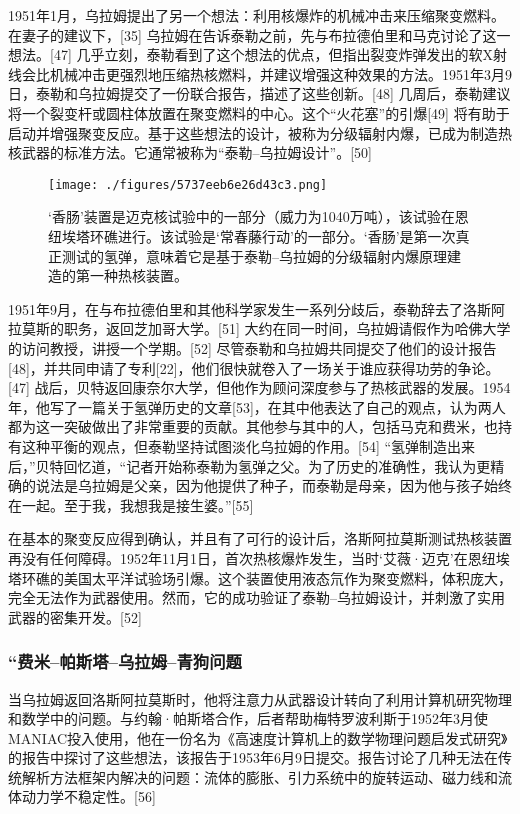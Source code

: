 1951年1月，乌拉姆提出了另一个想法：利用核爆炸的机械冲击来压缩聚变燃料。在妻子的建议下，[35] 乌拉姆在告诉泰勒之前，先与布拉德伯里和马克讨论了这一想法。[47] 几乎立刻，泰勒看到了这个想法的优点，但指出裂变炸弹发出的软X射线会比机械冲击更强烈地压缩热核燃料，并建议增强这种效果的方法。1951年3月9日，泰勒和乌拉姆提交了一份联合报告，描述了这些创新。[48] 几周后，泰勒建议将一个裂变杆或圆柱体放置在聚变燃料的中心。这个“火花塞”的引爆[49] 将有助于启动并增强聚变反应。基于这些想法的设计，被称为分级辐射内爆，已成为制造热核武器的标准方法。它通常被称为“泰勒–乌拉姆设计”。[50]
\begin{figure}[ht]
\centering
\texttt{[image: ./figures/5737eeb6e26d43c3.png]}
\caption{‘香肠’装置是迈克核试验中的一部分（威力为1040万吨），该试验在恩纽埃塔环礁进行。该试验是‘常春藤行动’的一部分。‘香肠’是第一次真正测试的氢弹，意味着它是基于泰勒–乌拉姆的分级辐射内爆原理建造的第一种热核装置。} \label{fig_Ulam_6}
\end{figure}
1951年9月，在与布拉德伯里和其他科学家发生一系列分歧后，泰勒辞去了洛斯阿拉莫斯的职务，返回芝加哥大学。[51] 大约在同一时间，乌拉姆请假作为哈佛大学的访问教授，讲授一个学期。[52] 尽管泰勒和乌拉姆共同提交了他们的设计报告[48]，并共同申请了专利[22]，他们很快就卷入了一场关于谁应获得功劳的争论。[47] 战后，贝特返回康奈尔大学，但他作为顾问深度参与了热核武器的发展。1954年，他写了一篇关于氢弹历史的文章[53]，在其中他表达了自己的观点，认为两人都为这一突破做出了非常重要的贡献。其他参与其中的人，包括马克和费米，也持有这种平衡的观点，但泰勒坚持试图淡化乌拉姆的作用。[54] “氢弹制造出来后，”贝特回忆道，“记者开始称泰勒为氢弹之父。为了历史的准确性，我认为更精确的说法是乌拉姆是父亲，因为他提供了种子，而泰勒是母亲，因为他与孩子始终在一起。至于我，我想我是接生婆。”[55]

在基本的聚变反应得到确认，并且有了可行的设计后，洛斯阿拉莫斯测试热核装置再没有任何障碍。1952年11月1日，首次热核爆炸发生，当时‘艾薇·迈克’在恩纽埃塔环礁的美国太平洋试验场引爆。这个装置使用液态氘作为聚变燃料，体积庞大，完全无法作为武器使用。然而，它的成功验证了泰勒–乌拉姆设计，并刺激了实用武器的密集开发。[52]
\subsubsection{“费米–帕斯塔–乌拉姆–青狗问题 }
当乌拉姆返回洛斯阿拉莫斯时，他将注意力从武器设计转向了利用计算机研究物理和数学中的问题。与约翰·帕斯塔合作，后者帮助梅特罗波利斯于1952年3月使MANIAC投入使用，他在一份名为《高速度计算机上的数学物理问题启发式研究》的报告中探讨了这些想法，该报告于1953年6月9日提交。报告讨论了几种无法在传统解析方法框架内解决的问题：流体的膨胀、引力系统中的旋转运动、磁力线和流体动力学不稳定性。[56]


